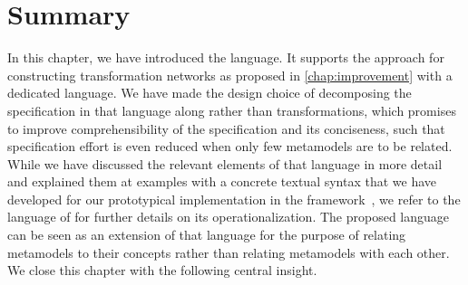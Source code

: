 \section{Summary}

In this chapter, we have introduced the \commonalities language.
It supports the \commonalities approach for constructing transformation networks as proposed in \autoref{chap:improvement} with a dedicated language.
We have made the design choice of decomposing the specification in that language along \commonalities rather than transformations, which promises to improve comprehensibility of the specification and its conciseness, such that specification effort is even reduced when only few metamodels are to be related.
While we have discussed the relevant elements of that language in more detail and explained them at examples with a concrete textual syntax that we have developed for our prototypical implementation in the \vitruv framework~\cite{vitruvFrameworkGithub}, we refer to the \mappings language of \textcite{kramer2017a} for further details on its operationalization.
The proposed \commonalities language can be seen as an extension of that \mappings language for the purpose of relating metamodels to their concepts rather than relating metamodels with each other.
We close this chapter with the following central insight.

